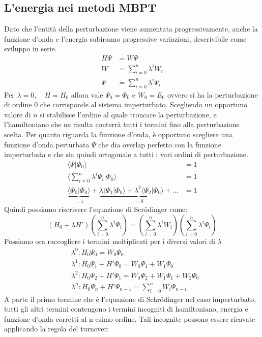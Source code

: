 \documentclass[oneside]{amsbook}
\numberwithin{section}{chapter}
\numberwithin{equation}{section}
\numberwithin{figure}{section}
\begin{document}
\subsection{L'energia nei metodi MBPT}
Dato che l'entità della perturbazione viene aumentata progressivamente, anche la funzione d'onda e l'energia subiranno progressive variazioni, descrivibile come sviluppo in serie.
\begin{equation}
\begin{aligned}
H\Psi &=  W \Psi \\
W &= \sum \limits _{i=0} ^n \lambda^i W_i \\
\Psi &= \sum \limits _{i=0} ^n \lambda^i \Psi_i 
\end{aligned}
\end{equation}
Per $\lambda = 0, \quad H= H_0$ allora vale $\Psi_0 = \Phi_0 $ e $W_0=E_0$ ovvero si ha la perturbazione di ordine 0 che corrisponde al sistema imperturbato. Scegliendo un opportuno valore di $n$ si stabilisce l'ordine al quale troncare la perturbazione, e l'hamiltoniano che ne risulta conterrà tutti i termini fino alla perturbazione scelta.
Per quanto riguarda la funzione d'onda, è opportuno scegliere una funzione d'onda perturbata $\Psi$ che dia overlap perfetto con la funzione imperturbata e che sia quindi ortogonale a tutti i vari ordini di perturbazione.
\begin{equation}
\begin{aligned}
\langle\Psi\vert\Phi_0\rangle &= 1 \\
\langle  \sum \limits _{i=0} ^n \lambda^i \Psi_i \vert \Phi_0 \rangle &= 1 \\
\underbrace{\langle\Phi_0\vert\Phi_0\rangle}_{=1} + \underbrace{\lambda\langle\Psi_1\vert\Phi_0\rangle + \lambda^2\langle\Psi_2\vert\Phi_0\rangle + \ldots}_{=0} &= 1
\end{aligned}
\end{equation}
Quindi possiamo riscrivere l'equazione di Scr\"odinger come:
\begin{equation}
(H_0+\lambda H')( \sum \limits _{i=0} ^n \lambda^i \Psi_i)=(\sum \limits _{i=0} ^n \lambda^i W_i)( \sum \limits _{i=0} ^n \lambda^i \Psi_i)
\end{equation}
Possiamo ora raccogliere i termini moltiplicati per i diversi valori di $\lambda$
\begin{equation}
\label{MBPorcodio}
\begin{aligned}
&\lambda^0 : H_0 \Psi_0 = W_0 \Psi_0 \\
&\lambda^1 : H_0 \Psi_1 + H'\Psi_0 = W_0 \Psi_1 + W_1 \Psi_0\\
&\lambda^2 : H_0 \Psi_2 + H'\Psi_1 = W_0 \Psi_2 + W_1 \Psi_1 + W_2 \Psi_0 \\
&\lambda^n : H_0 \Psi_n + H'\Psi_{n-1} = \sum \limits _{i=0} ^n W_i \Psi_{n-i}
\end{aligned}
\end{equation}
A parte il primo termine che è l'equazione di Schr\"odinger nel caso imperturbato, tutti gli altri termini contengono i termini incogniti di hamiltoniano, energia e funzione d'onda corretti al n-esimo ordine. Tali incognite possono essere ricavate applicando la regola del turnover:
\end{document}
